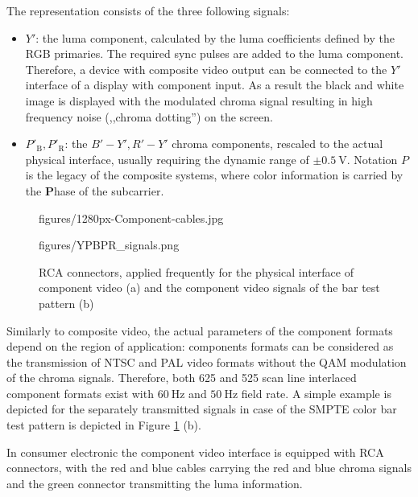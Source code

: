 The \ypbpr representation consists of the three following signals:
\begin{itemize}
\item $Y'$: the luma component, calculated by the luma coefficients defined by the RGB primaries.
The required sync pulses are added to the luma component.
Therefore, a device with composite video output can be connected to the $Y'$ interface of a display with component input.
As a result the black and white image is displayed with the modulated chroma signal resulting in high frequency noise (,,chroma dotting'') on the screen.
\item $P'_{\mathrm{B}},P'_{\mathrm{R}}$: the $B'-Y', R'-Y'$ chroma components, rescaled to the actual physical interface, usually requiring the dynamic range of $\pm 0.5~\mathrm{V}$.
Notation $P$ is the legacy of the composite systems, where color information is carried by the \textbf{P}hase of the subcarrier.
\end{itemize}
\begin{figure}[]
	\centering
	\begin{overpic}[width = 0.45\columnwidth ]{figures/1280px-Component-cables.jpg}
	\end{overpic} \hfill
	\begin{overpic}[width = 0.45\columnwidth ]{figures/YPBPR_signals.png}
	\end{overpic} \hfill
	\caption{RCA connectors, applied frequently for the physical interface of component video (a) and the component video signals of the bar test pattern (b)}
	\label{Fig:comp_video}
\end{figure}
Similarly to composite video, the actual parameters of the component formats depend on the region of application: 
components formats can be considered as the transmission of NTSC and PAL video formats without the QAM modulation of the chroma signals.
Therefore, both 625 and 525 scan line interlaced component formats exist with $60~\mathrm{Hz}$ and $50~\mathrm{Hz}$ field rate.
A simple example is depicted for the separately transmitted \ypbpr signals in case of the SMPTE color bar test pattern is depicted in Figure \ref{Fig:comp_video} (b).

In consumer electronic the component video interface is equipped with RCA connectors, with the red and blue cables carrying the red and blue chroma signals and the green connector transmitting the luma information.

